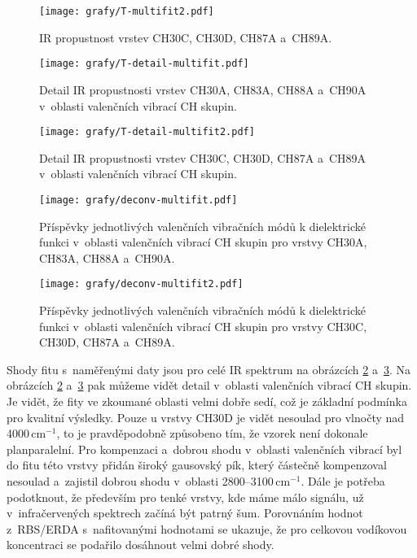 \begin{figure}[htbp]
	\texttt{[image: grafy/T-multifit2.pdf]}
	\caption{IR propustnost vrstev CH30C, CH30D, CH87A a~CH89A.}
	\label{T-multifit2}
\end{figure}

\begin{figure}[htbp]
	\texttt{[image: grafy/T-detail-multifit.pdf]}
	\caption{Detail IR propustnosti vrstev CH30A, CH83A, CH88A a~CH90A v~oblasti valenčních vibrací CH skupin.}
	\label{T-detail}
\end{figure}

\begin{figure}[htbp]
	\texttt{[image: grafy/T-detail-multifit2.pdf]}
	\caption{Detail IR propustnosti vrstev CH30C, CH30D, CH87A a~CH89A v~oblasti valenčních vibrací CH skupin.}
	\label{T-detail2}
\end{figure}

\begin{figure}[htbp]
	\texttt{[image: grafy/deconv-multifit.pdf]}
	\caption{Příspěvky jednotlivých valenčních vibračních módů k dielektrické funkci v~oblasti valenčních vibrací CH skupin pro vrstvy CH30A, CH83A, CH88A a~CH90A.}
	\label{deconvolute}
\end{figure}

\begin{figure}[htbp]
	\texttt{[image: grafy/deconv-multifit2.pdf]}
	\caption{Příspěvky jednotlivých valenčních vibračních módů k dielektrické funkci v~oblasti valenčních vibrací CH skupin pro vrstvy CH30C, CH30D, CH87A a~CH89A.}
	\label{deconvolute2}
\end{figure}

Shody fitu s~naměřenými daty jsou pro celé IR spektrum na obrázcích \ref{T-detail} a~\ref{T-detail2}. Na obrázcích \ref{T-detail} a~\ref{T-detail2} pak můžeme vidět detail v~oblasti valenčních vibrací CH skupin. Je vidět, že fity ve zkoumané oblasti velmi dobře sedí, což je základní podmínka pro kvalitní výsledky. Pouze u vrstvy CH30D je vidět nesoulad pro vlnočty nad 4000\,cm$^{-1}$, to je pravděpodobně způsobeno tím, že vzorek není dokonale planparalelní. Pro kompenzaci a~dobrou shodu v~oblasti valenčních vibrací byl do fitu této vrstvy přidán široký gausovský pík, který částečně kompenzoval nesoulad a~zajistil dobrou shodu v~oblasti 2800--3100\,cm$^{-1}$. Dále je potřeba podotknout, že především pro tenké vrstvy, kde máme málo signálu, už v~infračervených spektrech začíná být patrný šum.  
Porovnáním hodnot z~RBS/ERDA s~nafitovanými hodnotami se ukazuje, že pro celkovou vodíkovou koncentraci se podařilo dosáhnout velmi dobré shody.

